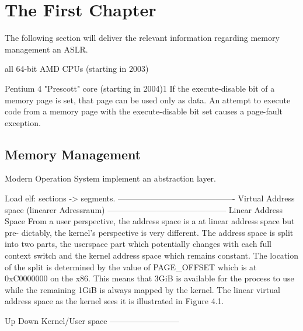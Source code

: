 \chapter{The First Chapter}
\label{cha:1}
The following section will deliver the relevant information regarding memory management an ASLR.

all 64-bit AMD CPUs (starting in 2003)
\cite{guide2017amd64}

Pentium 4 "Prescott" core (starting in 2004)1
\cite{guide2017intel}
If the execute-disable bit of a memory page is set, that page can be used only as data. An attempt to execute code
from a memory page with the execute-disable bit set causes a page-fault exception.

\section{Memory Management}
Modern Operation System implement an abstraction layer.

Load elf: sections -> segments.
-------------------------------------------
Virtual Address space (linearer Adressraum)
--------------------------------------------
Linear Address Space
From a user perspective, the address space is a at linear address space but pre-
dictably, the kernel's perspective is very different. The address space is split into
two parts, the userspace part which potentially changes with each full context switch
and the kernel address space which remains constant. The location of the split is
determined by the value of PAGE\_OFFSET which is at 0xC0000000 on the x86. This
means that 3GiB is available for the process to use while the remaining 1GiB is
always mapped by the kernel. The linear virtual address space as the kernel sees it
is illustrated in Figure 4.1.
\cite{gorman2004linuxvmmgr}


Up Down Kernel/User space
--------------------------












\cite{cowan2000buffer}
\cite{marco2014effectiveness}
\cite{kerrigan2012study}
\cite{guide2017intel}
\cite{wojtczuk2011following}
\cite{alt2015entropy}
\cite{thompsonrandomness}
\cite{celesti2010improving}
\cite{mueller@bsi1}
\cite{mueller@bsi2}
\cite{marco2013preventing}



